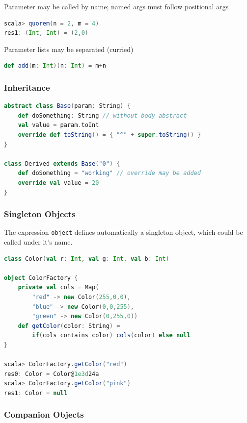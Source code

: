 Parameter may be called by name; named args must follow positional args

\begin{lstlisting}[language=scala]
scala> quorem(n = 2, m = 4)
res1: (Int, Int) = (2,0)
\end{lstlisting}

Parameter lists may be separated (curried)

\begin{lstlisting}[language=scala]
def add(m: Int)(n: Int) = m+n
\end{lstlisting}

\hypertarget{inheritance}{%
\subsubsection{Inheritance}\label{inheritance}}

\begin{lstlisting}[language=scala]
abstract class Base(param: String) {
    def doSomething: String // without body abstract
    val value = param.toInt
    override def toString() = { "^" + super.toString() }
}

class Derived extends Base("0") {
    def doSomething = "working" // override may be added
    override val value = 20
}
\end{lstlisting}

\clearpage
\hypertarget{singleton-objects}{%
\subsubsection{Singleton Objects}\label{singleton-objects}}

The expression \texttt{object} defines automatically a singleton object,
which could be called under it's name.

\begin{lstlisting}[language=scala]
class Color(val r: Int, val g: Int, val b: Int)

object ColorFactory {
    private val cols = Map(
        "red" -> new Color(255,0,0),
        "blue" -> new Color(0,0,255),
        "green" -> new Color(0,255,0))
    def getColor(color: String) =
        if(cols contains color) cols(color) else null
}

scala> ColorFactory.getColor("red")
res0: Color = Color@1e3d24a
scala> ColorFactory.getColor("pink")
res1: Color = null
\end{lstlisting}

\hypertarget{companion-objects}{%
\subsubsection{Companion Objects}\label{companion-objects}}

